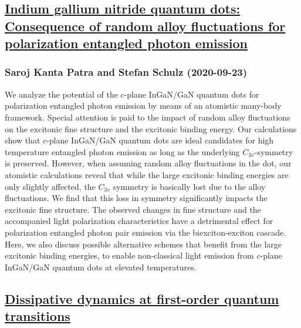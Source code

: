 \subsection*{\href{http://arxiv.org/abs/2009.11161v1}{Indium gallium nitride quantum dots: Consequence of random alloy  fluctuations for polarization entangled photon emission}}
\subsubsection*{Saroj Kanta Patra and Stefan Schulz (2020-09-23)}
We analyze the potential of the $c$-plane InGaN/GaN quantum dots for
polarization entangled photon emission by means of an atomistic many-body
framework. Special attention is paid to the impact of random alloy fluctuations
on the excitonic fine structure and the excitonic binding energy. Our
calculations show that $c$-plane InGaN/GaN quantum dots are ideal candidates
for high temperature entangled photon emission as long as the underlying
$C_{3v}$-symmetry is preserved. However, when assuming random alloy
fluctuations in the dot, our atomistic calculations reveal that while the large
excitonic binding energies are only slightly affected, the $C_{3v}$ symmetry is
basically lost due to the alloy fluctuations. We find that this loss in
symmetry significantly impacts the excitonic fine structure. The observed
changes in fine structure and the accompanied light polarization
characteristics have a detrimental effect for polarization entangled photon
pair emission via the biexciton-exciton cascade. Here, we also discuss possible
alternative schemes that benefit from the large excitonic binding energies, to
enable non-classical light emission from $c$-plane InGaN/GaN quantum dots at
elevated temperatures.

\subsection*{\href{http://arxiv.org/abs/2009.11158v1}{Dissipative dynamics at first-order quantum transitions}}
